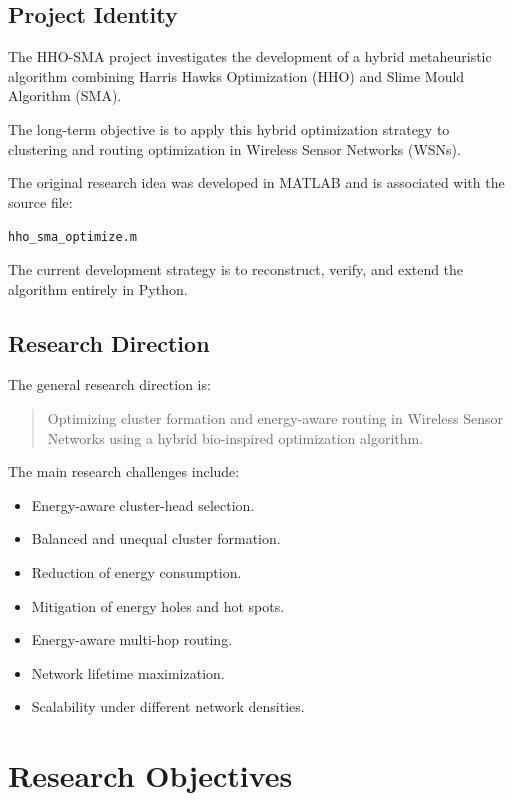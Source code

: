 \documentclass[12pt,a4paper]{report}
\begin{document}
\section{Project Identity}

The HHO-SMA project investigates the development of a
hybrid metaheuristic algorithm combining Harris Hawks
Optimization (HHO) and Slime Mould Algorithm (SMA).

The long-term objective is to apply this hybrid
optimization strategy to clustering and routing
optimization in Wireless Sensor Networks (WSNs).

The original research idea was developed in MATLAB
and is associated with the source file:

\begin{center}
\texttt{hho\_sma\_optimize.m}
\end{center}

The current development strategy is to reconstruct,
verify, and extend the algorithm entirely in Python.

\section{Research Direction}

The general research direction is:

\begin{quote}
Optimizing cluster formation and energy-aware routing
in Wireless Sensor Networks using a hybrid
bio-inspired optimization algorithm.
\end{quote}

The main research challenges include:

\begin{itemize}
    \item Energy-aware cluster-head selection.
    \item Balanced and unequal cluster formation.
    \item Reduction of energy consumption.
    \item Mitigation of energy holes and hot spots.
    \item Energy-aware multi-hop routing.
    \item Network lifetime maximization.
    \item Scalability under different network densities.
\end{itemize}

\chapter{Research Objectives}
\end{document}
